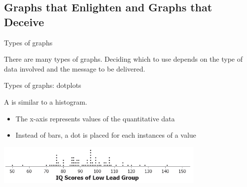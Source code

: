 \documentclass[]{beamer}
\begin{document}
\subsection{Graphs that Enlighten and Graphs that Deceive}

\begin{frame}{Types of graphs}

\begin{block}{}
\large
There are many types of graphs. Deciding which to use depends on the type of data involved and the message to be delivered.
\end{block}
\end{frame}

\begin{frame}{Types of graphs: dotplots}
\begin{block}{}
A  is similar to a histogram. 
\begin{itemize}
\item The x-axis represents values of the quantitative data
\item Instead of bars, a dot is placed for each instances of a value
\end{itemize}
\end{block}
\bigskip
{\centering
\includegraphics[width=4in]{../images/ch02_dotplot}
\par}
\end{frame}
\end{document}
